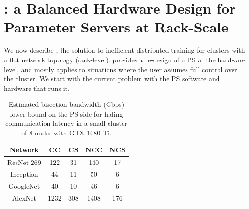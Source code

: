 \chapter{\pbox: a Balanced Hardware Design for Parameter Servers at Rack-Scale}
\label{sec:phub}
We now describe \pbox, the solution to inefficient distributed training for clusters with a flat network topology (rack-level). \pbox provides a re-design of a PS at the hardware level, and mostly applies to situations where the user assumes full control over the cluster. We start with the current problem with the PS software and hardware that runs it.

\begin{table}
        \centering
        \footnotesize
	\begin{tabular}{|c|c|c|c|c|}
		\hline
		Network   & CC & CS & NCC & NCS\\
		\hline
		ResNet 269    & 122   & 31   & 140    &  17   \\
		\hline
		Inception & 44   &  11  &  50   &  6  \\
		\hline
		GoogleNet & 40   &  10  &  46   &  6  \\
	
		\hline 
		AlexNet   & 1232  &  308  & 1408    &  176  \\
		\hline
	\end{tabular}
	\caption{Estimated bisection bandwidth (Gbps) lower bound on the PS side for hiding communication latency in a small cluster of 8 nodes with GTX 1080 Ti.}
	\label{table:bwReqDC}
\end{table}

